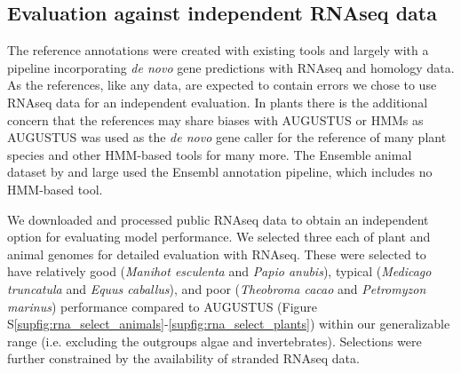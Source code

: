 \documentclass{bioinfo}
\newcounter{supfig}
\begin{document}
\begin{methods}
\subsection{Evaluation against independent RNAseq data}
\label{sec:rnaseq}
The reference annotations were created with existing tools and largely with a pipeline incorporating
{\it de novo} gene predictions with RNAseq and homology data. As the references, like any
data, are expected to contain errors we chose to use RNAseq data for an independent evaluation.
In plants there is the additional concern that the references may share biases with
AUGUSTUS or HMMs as AUGUSTUS was used as the {\it de novo} gene caller for the reference of
many plant species %
and other HMM-based tools for many more. %
The Ensemble animal dataset by and large
used the Ensembl annotation pipeline, which includes no HMM-based tool.

We downloaded and processed public RNAseq data to obtain an independent option 
for evaluating model performance. We selected three each of plant and animal genomes for
detailed evaluation with RNAseq. These were selected to have relatively good 
({\it Manihot esculenta} and {\it Papio anubis}), 
typical ({\it Medicago truncatula} and {\it Equus caballus}), 
and poor ({\it Theobroma cacao} and {\it Petromyzon marinus})
performance compared to AUGUSTUS (Figure S\ref{supfig:rna_select_animals}-\ref{supfig:rna_select_plants}) %
within our generalizable range (i.e. excluding the outgroups algae and
invertebrates). Selections were further constrained by the availability of stranded RNAseq
data. 


\end{methods}
\end{document}
